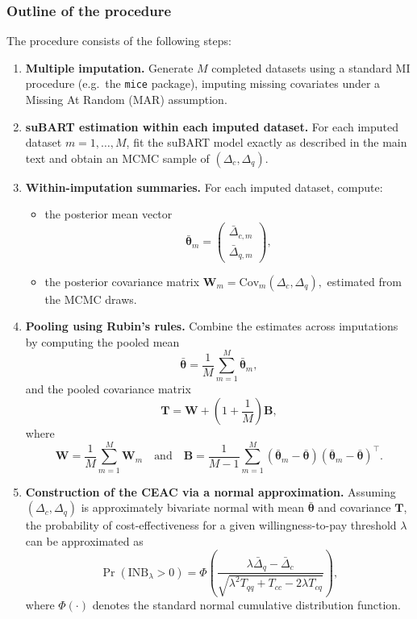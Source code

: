 \documentclass[aoas,preprint]{imsart}
\theoremstyle{plain}
\theoremstyle{definition}
\theoremstyle{remark}
\theoremstyle{remark}
\begin{document}
\subsubsection{Outline of the procedure}
The procedure consists of the following steps:

\begin{enumerate}
    \item \textbf{Multiple imputation.}  
    Generate $M$ completed datasets using a standard MI procedure (e.g.\ the \texttt{mice} package), imputing missing covariates under a Missing At Random (MAR) assumption.

    \item \textbf{suBART estimation within each imputed dataset.}  
    For each imputed dataset $m = 1,\dots,M$, fit the suBART model exactly as described in the main text and obtain an MCMC sample of $(\Delta_c, \Delta_q)$.

    \item \textbf{Within-imputation summaries.}  
    For each imputed dataset, compute:
    \begin{itemize}
        \item the posterior mean vector
        \[
        \bar{\boldsymbol{\theta}}_m
        =
        \begin{pmatrix}
        \bar{\Delta}_{c,m} \\
        \bar{\Delta}_{q,m}
        \end{pmatrix},
        \]
        \item the posterior covariance matrix
        \(
        \mathbf{W}_m = \mathrm{Cov}_m(\Delta_c, \Delta_q),
        \)
        estimated from the MCMC draws.
    \end{itemize}

    \item \textbf{Pooling using Rubin’s rules.}  
    Combine the estimates across imputations by computing the pooled mean
    \[
    \bar{\boldsymbol{\theta}} = \frac{1}{M}\sum_{m=1}^M \bar{\boldsymbol{\theta}}_m,
    \]
    and the pooled covariance matrix
    \[
    \mathbf{T} = \mathbf{W} + \left(1 + \frac{1}{M}\right)\mathbf{B},
    \]
    where
    \[
    \mathbf{W} = \frac{1}{M}\sum_{m=1}^M \mathbf{W}_m
    \quad \text{and} \quad
    \mathbf{B} = \frac{1}{M-1}\sum_{m=1}^M
    (\bar{\boldsymbol{\theta}}_m - \bar{\boldsymbol{\theta}})
    (\bar{\boldsymbol{\theta}}_m - \bar{\boldsymbol{\theta}})^\top.
    \]

    \item \textbf{Construction of the CEAC via a normal approximation.}  
    Assuming $(\Delta_c, \Delta_q)$ is approximately bivariate normal with mean $\bar{\boldsymbol{\theta}}$ and covariance $\mathbf{T}$, the probability of cost-effectiveness for a given willingness-to-pay threshold $\lambda$ can be approximated as
    \[
    \Pr(\text{INB}_{\lambda} > 0)
    =
    \Phi\!\left(
    \frac{\lambda \bar{\Delta}_q - \bar{\Delta}_c}
         {\sqrt{\lambda^2 T_{qq} + T_{cc} - 2\lambda T_{cq}}}
    \right),
    \]
    where $\Phi(\cdot)$ denotes the standard normal cumulative distribution function.
\end{enumerate}
\end{document}
